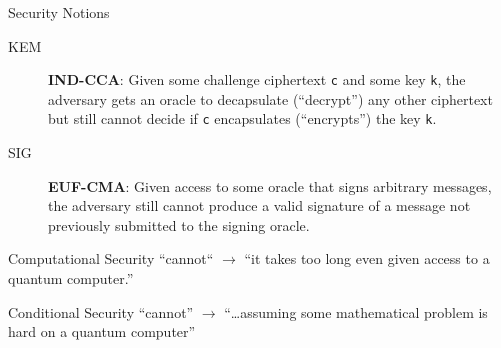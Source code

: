 \documentclass[xcolor=table,10pt,aspectratio=169]{beamer}
\begin{document}
\begin{frame}[label={sec:org7ee9033},fragile]{Security Notions}
 \begin{description}
\item[{KEM}] \textbf{IND-CCA}: Given some challenge ciphertext \texttt{c} and some key \texttt{k}, the adversary gets an oracle to decapsulate (“decrypt”) any other ciphertext but still cannot decide if \texttt{c} encapsulates (“encrypts”) the key \texttt{k}.

\item[{SIG}] \textbf{EUF-CMA}: Given access to some oracle that signs arbitrary messages, the adversary still cannot produce a valid signature of a message not previously submitted to the signing oracle.
\end{description}

\pause

\begin{block}{Computational Security}
“cannot“ \(\rightarrow\) “it takes too long even given access to a quantum computer.”


\pause
\end{block}

\begin{block}{Conditional Security}
“cannot” \(\rightarrow\) “\ldots assuming some mathematical problem is hard on a quantum computer”
\end{block}
\end{frame}
\end{document}
